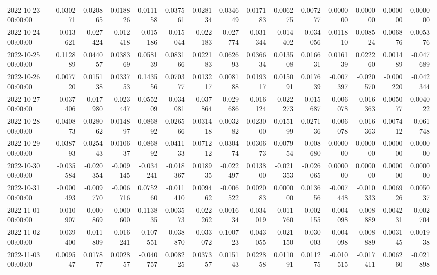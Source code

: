\begin{tabular}{lrrrrrrrrrrrrrr}
2022-10-23 00:00:00 & 0.030271 & 0.020865 & 0.018826 & 0.011158 & 0.037561 & 0.028134 & 0.034649 & 0.017183 & 0.006275 & 0.007277 & 0.000000 & 0.000000 & 0.000000 & 0.000000 \\
2022-10-24 00:00:00 & -0.013621 & -0.027424 & -0.012418 & -0.015186 & -0.015044 & -0.022183 & -0.027774 & -0.031344 & -0.014402 & -0.034056 & 0.011810 & 0.008524 & 0.006876 & 0.005376 \\
2022-10-25 00:00:00 & 0.112889 & 0.044057 & 0.038369 & 0.058139 & 0.083166 & 0.022183 & 0.062693 & 0.036634 & 0.013508 & 0.016631 & 0.016139 & 0.022260 & 0.001489 & -0.047689 \\
2022-10-26 00:00:00 & 0.007720 & 0.015138 & 0.033753 & 0.143556 & 0.070377 & 0.013217 & 0.008188 & 0.019317 & 0.015091 & 0.017639 & -0.007397 & -0.020570 & -0.000220 & -0.042344 \\
2022-10-27 00:00:00 & -0.037406 & -0.017980 & -0.023447 & 0.055209 & -0.034081 & -0.037864 & -0.029686 & -0.016124 & -0.022273 & -0.015687 & -0.006078 & -0.016363 & 0.005077 & 0.004022 \\
2022-10-28 00:00:00 & 0.040873 & 0.028062 & 0.014897 & 0.086892 & 0.026566 & 0.031418 & 0.003282 & 0.023000 & 0.015199 & 0.027136 & -0.006078 & -0.016363 & 0.007412 & -0.061748 \\
2022-10-29 00:00:00 & 0.038793 & 0.025443 & 0.010637 & 0.086892 & 0.041133 & 0.071212 & 0.030474 & 0.030673 & 0.007954 & -0.008680 & 0.000000 & 0.000000 & 0.000000 & 0.000000 \\
2022-10-30 00:00:00 & -0.035584 & -0.020354 & -0.009145 & -0.034241 & -0.018367 & 0.018935 & -0.022497 & 0.013800 & -0.021353 & -0.026065 & 0.000000 & 0.000000 & 0.000000 & 0.000000 \\
2022-10-31 00:00:00 & -0.000493 & -0.009770 & -0.006716 & 0.075260 & -0.011410 & 0.009462 & -0.006522 & 0.002083 & 0.000000 & 0.013656 & -0.007448 & -0.010333 & 0.006926 & 0.005037 \\
2022-11-01 00:00:00 & -0.010907 & -0.000869 & -0.000600 & 0.113835 & 0.003573 & -0.022262 & 0.001634 & -0.034019 & -0.011760 & -0.002155 & -0.004098 & -0.008889 & 0.004231 & -0.002704 \\
2022-11-02 00:00:00 & -0.039400 & -0.011809 & -0.016241 & -0.107551 & -0.038870 & -0.033072 & 0.100723 & -0.043055 & -0.021150 & -0.030003 & -0.004098 & -0.008889 & 0.003145 & 0.001938 \\
2022-11-03 00:00:00 & 0.009547 & 0.017877 & 0.002857 & -0.040757 & 0.008225 & 0.037357 & 0.015143 & 0.022858 & 0.011091 & 0.011275 & -0.010515 & -0.017411 & 0.006260 & -0.021898 \\

\end{tabular}
